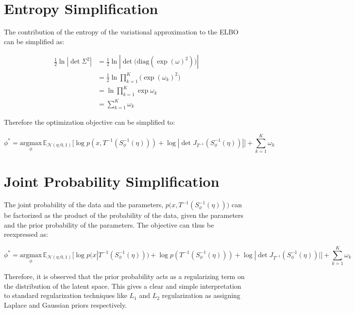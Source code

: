 \documentclass[10pt]{article}
\begin{document}
\section*{Entropy Simplification}

The contribution of the entropy of the variational approximation to the ELBO can be simplified as:

\begin{align*}
  \frac{1}{2}\ln| \det \Sigma ^ 2| &= \frac{1}{2}\ln |\det \big(\text{diag}(\exp(\omega) ^ 2)\big)|  \\
  &= \frac{1}{2}\ln \prod_{k=1}^{K}\big(\exp(\omega_k)^2\big) \\
  &= \ln \prod_{k=1}^{K}\exp \omega_k \\
  &= \sum_{k=1}^{K}\omega_k
\end{align*}

Therefore the optimization objective can be simplified to:

\begin{equation*}
  \phi^* = \underset{\phi}{\text{argmax}} \, \mathbb{E}_{\mathcal{N}(\eta; 0, 1)}\big[\log p(x, T^{-1}(S_\phi^{-1}(\eta))) + \log |\det J_{T^{-1}}(S_\phi^{-1}(\eta))|\big] + \sum_{k=1}^{K}\omega_k
\end{equation*}

\section*{Joint Probability Simplification}

The joint probability of the data and the parameters, $p\big(x, T^{-1}(S_\phi^{-1}(\eta))\big)$ can be factorized as the product 
of the probability of the data, given the parameters and the prior probability of the parameters. The objective can thus be 
reexpressed as:

\begin{equation*}
  \phi^* = \underset{\phi}{\text{argmax}} \, \mathbb{E}_{\mathcal{N}(\eta; 0, 1)}\big[\log p(x | T^{-1}(S_\phi^{-1}(\eta))) + \log p(T^{-1}(S_\phi^{-1}(\eta))) + \log |\det J_{T^{-1}}(S_\phi^{-1}(\eta))|\big] + \sum_{k=1}^{K}\omega_k
\end{equation*}


Therefore, it is observed that the prior probability acts as a regularizing term on the distribution of the latent space. This gives 
a clear and simple interpretation to standard regularization techniques like $L_1$ and $L_2$ regularization as assigning Laplace
and Gaussian priors respectively. 
\end{document}
